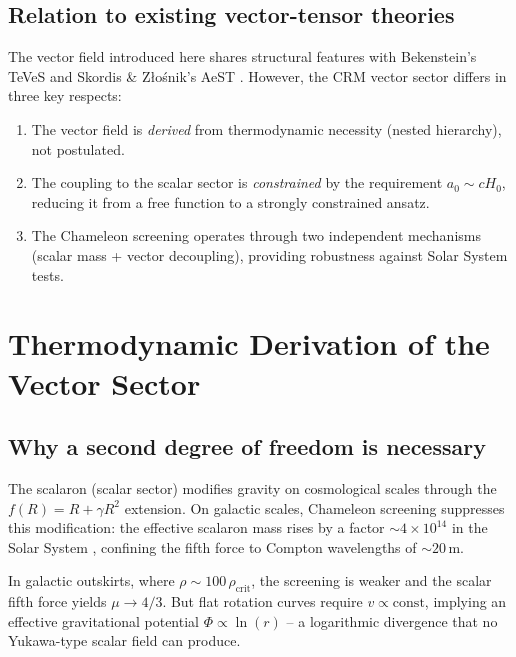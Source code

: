 \documentclass[aps,prd,twocolumn,superscriptaddress,nofootinbib]{revtex4-2}
\begin{document}
\subsection{Relation to existing vector-tensor theories}

The vector field introduced here shares structural features with Bekenstein's TeVeS \cite{Bekenstein2004} and Skordis \& Z{\l}o\'snik's AeST \cite{Skordis2021}. However, the CRM vector sector differs in three key respects:
\begin{enumerate}
\item The vector field is \textit{derived} from thermodynamic necessity (nested hierarchy), not postulated.
\item The coupling to the scalar sector is \textit{constrained} by the requirement $a_0 \sim cH_0$, reducing it from a free function to a strongly constrained ansatz.
\item The Chameleon screening operates through two independent mechanisms (scalar mass + vector decoupling), providing robustness against Solar System tests.
\end{enumerate}


\section{Thermodynamic Derivation of the Vector Sector}
\label{sec:derivation}

\subsection{Why a second degree of freedom is necessary}
\label{sec:why_vector}

The scalaron (scalar sector) modifies gravity on cosmological scales through the $f(R) = R + \gamma R^2$ extension. On galactic scales, Chameleon screening suppresses this modification: the effective scalaron mass rises by a factor $\sim 4 \times 10^{14}$ in the Solar System \cite{Geiger2026c}, confining the fifth force to Compton wavelengths of $\sim 20$\,m.

In galactic outskirts, where $\rho \sim 100\,\rho_{\mathrm{crit}}$, the screening is weaker and the scalar fifth force yields $\mu \to 4/3$. But flat rotation curves require $v \propto \mathrm{const}$, implying an effective gravitational potential $\Phi \propto \ln(r)$ -- a logarithmic divergence that no Yukawa-type scalar field can produce.
\end{document}

